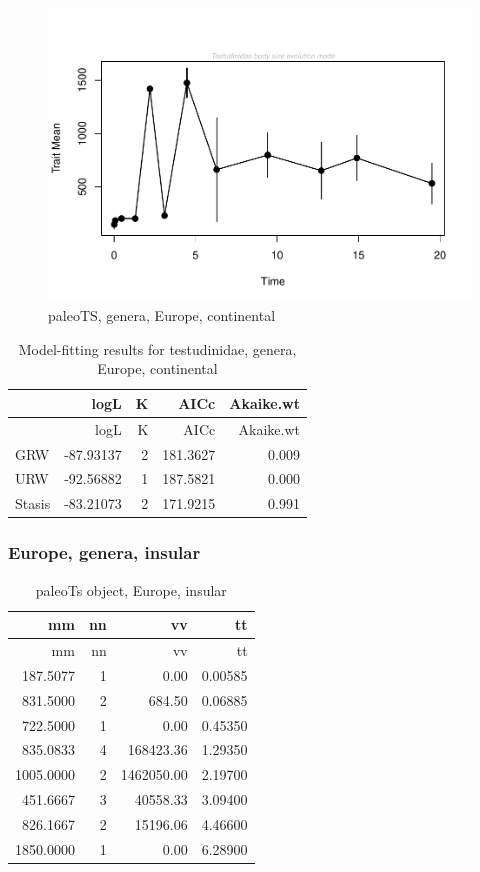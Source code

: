 \begin{figure}[H]
	\centering
	\includegraphics{MA_JJ_files/figure-latex/pTSEuC-1.pdf}
	\caption{paleoTS, genera, Europe, continental}
	\label{fig:pTSEuC}
\end{figure}

\begin{longtable}[]{@{}lrrrr@{}}
	\caption{Model-fitting results for testudinidae, genera, Europe,
		continental}
	\label{tab:pTSEuCEM}\tabularnewline
	\toprule
	& logL & K & AICc & Akaike.wt\tabularnewline
	\midrule
	\endfirsthead
	\toprule
	& logL & K & AICc & Akaike.wt\tabularnewline
	\midrule
	\endhead
	GRW & -87.93137 & 2 & 181.3627 & 0.009\tabularnewline
	URW & -92.56882 & 1 & 187.5821 & 0.000\tabularnewline
	Stasis & -83.21073 & 2 & 171.9215 & 0.991\tabularnewline
	\bottomrule
\end{longtable}


\FloatBarrier


\subsubsection{Europe, genera,
	insular}\label{europe-genera-insular}

\begin{longtable}[]{@{}rrrr@{}}
	\caption{paleoTs object, Europe, insular}
	\label{tab:pTSEuI}\tabularnewline
	\toprule
	mm & nn & vv & tt\tabularnewline
	\midrule
	\endfirsthead
	\toprule
	mm & nn & vv & tt\tabularnewline
	\midrule
	\endhead
	187.5077 & 1 & 0.00 & 0.00585\tabularnewline
	831.5000 & 2 & 684.50 & 0.06885\tabularnewline
	722.5000 & 1 & 0.00 & 0.45350\tabularnewline
	835.0833 & 4 & 168423.36 & 1.29350\tabularnewline
	1005.0000 & 2 & 1462050.00 & 2.19700\tabularnewline
	451.6667 & 3 & 40558.33 & 3.09400\tabularnewline
	826.1667 & 2 & 15196.06 & 4.46600\tabularnewline
	1850.0000 & 1 & 0.00 & 6.28900\tabularnewline
	\bottomrule
\end{longtable}

